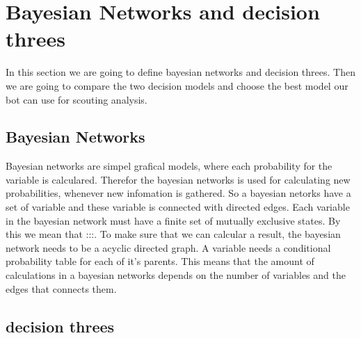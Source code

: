 \section{Bayesian Networks and decision threes}
In this section we are going to define bayesian networks and decision threes. Then we are going to compare the two decision models and choose
the best model our bot can use for scouting analysis.

\subsection{Bayesian Networks}
Bayesian networks are simpel grafical models, where each probability for the variable is calculared. Therefor the bayesian networks is used for
calculating new probabilities, whenever new infomation is gathered. So a bayesian netorks have a  set of variable and
these variable is connected with directed edges. Each variable in the bayesian network must have a finite set of mutually exclusive states. By this we mean
that :::. To make sure that we can calcular a result, the bayesian network needs to be a acyclic directed graph. A variable needs a conditional probability 
table for each of it's parents. This means that the amount of calculations in a bayesian networks depends on the number of variables and the edges that
connects them.

\subsection{decision threes}